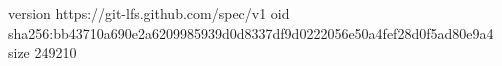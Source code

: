 version https://git-lfs.github.com/spec/v1
oid sha256:bb43710a690e2a6209985939d0d8337df9d0222056e50a4fef28d0f5ad80e9a4
size 249210
